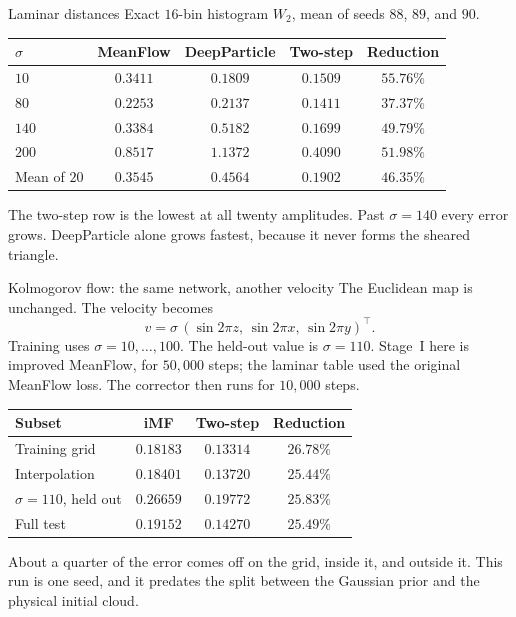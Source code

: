 \documentclass[aspectratio=169,11pt,t]{beamer}
\begin{document}
\begin{frame}{Laminar distances}
  Exact $16$-bin histogram $W_2$, mean of seeds $88$, $89$, and $90$.
  \vspace{0.25em}
  \small
  \begin{tabular}{@{}lcccc@{}}
    \toprule
    $\sigma$ & MeanFlow & DeepParticle & Two-step & Reduction \\
    \midrule
    $10$  & $0.3411$ & $0.1809$ & $0.1509$ & $55.76\%$ \\
    $80$  & $0.2253$ & $0.2137$ & $0.1411$ & $37.37\%$ \\
    $140$ & $0.3384$ & $0.5182$ & $0.1699$ & $49.79\%$ \\
    $200$ & $0.8517$ & $1.1372$ & $0.4090$ & $51.98\%$ \\
    \midrule
    Mean of $20$ & $0.3545$ & $0.4564$ & $0.1902$ & $46.35\%$ \\
    \bottomrule
  \end{tabular}
  \vspace{0.35em}
  \normalsize
  The two-step row is the lowest at all twenty amplitudes.
  Past $\sigma=140$ every error grows. DeepParticle alone grows fastest, because it never forms the sheared triangle.
\end{frame}

\begin{frame}{Kolmogorov flow: the same network, another velocity}
  The Euclidean map is unchanged. The velocity becomes
  \[
    v=\sigma\,(\sin 2\pi z,\,\sin 2\pi x,\,\sin 2\pi y)^\top.
  \]
  Training uses $\sigma=10,\ldots,100$. The held-out value is $\sigma=110$.
  Stage~I here is improved MeanFlow, for $50{,}000$ steps; the laminar table used the original MeanFlow loss.
  The corrector then runs for $10{,}000$ steps.
  \vspace{0.2em}
  \small
  \begin{tabular}{@{}lccc@{}}
    \toprule
    Subset & iMF & Two-step & Reduction \\
    \midrule
    Training grid & $0.18183$ & $0.13314$ & $26.78\%$ \\
    Interpolation & $0.18401$ & $0.13720$ & $25.44\%$ \\
    $\sigma=110$, held out & $0.26659$ & $0.19772$ & $25.83\%$ \\
    Full test & $0.19152$ & $0.14270$ & $25.49\%$ \\
    \bottomrule
  \end{tabular}
  \vspace{0.25em}
  \normalsize
  About a quarter of the error comes off on the grid, inside it, and outside it.
  This run is one seed, and it predates the split between the Gaussian prior and the physical initial cloud.
\end{frame}
\end{document}
